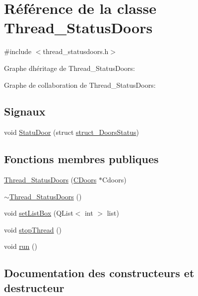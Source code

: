 \hypertarget{class_thread___status_doors}{}\section{Référence de la classe Thread\+\_\+\+Status\+Doors}
\label{class_thread___status_doors}


{\ttfamily \#include $<$thread\+\_\+statusdoors.\+h$>$}



Graphe d\textquotesingle{}héritage de Thread\+\_\+\+Status\+Doors\+:


Graphe de collaboration de Thread\+\_\+\+Status\+Doors\+:
\subsection*{Signaux}
\begin{DoxyCompactItemize}
\item 
void \hyperlink{class_thread___status_doors_a654d4cdaf566fd84ed2ece89d6336882}{Statu\+Door} (struct \hyperlink{structstruct___doors_status}{struct\+\_\+\+Doors\+Status})
\end{DoxyCompactItemize}
\subsection*{Fonctions membres publiques}
\begin{DoxyCompactItemize}
\item 
\hyperlink{class_thread___status_doors_a1d01ed90aa62c22e2d8d3fdd2d7e9364}{Thread\+\_\+\+Status\+Doors} (\hyperlink{class_c_doors}{C\+Doors} $\ast$Cdoors)
\item 
\hyperlink{class_thread___status_doors_a174ce0452503f8ea485ad083ebf9cf1b}{$\sim$\+Thread\+\_\+\+Status\+Doors} ()
\item 
void \hyperlink{class_thread___status_doors_a18867a3d9a012f4e725a7a8f2f59d8f8}{set\+List\+Box} (Q\+List$<$ int $>$ list)
\item 
void \hyperlink{class_thread___status_doors_aff536fa5487437266b62a5c49f272ec2}{stop\+Thread} ()
\item 
void \hyperlink{class_thread___status_doors_a77bbfd3af1bdd0d741adcb60aeee7b73}{run} ()
\end{DoxyCompactItemize}


\subsection{Documentation des constructeurs et destructeur}
\hypertarget{class_thread___status_doors_a1d01ed90aa62c22e2d8d3fdd2d7e9364}{}
